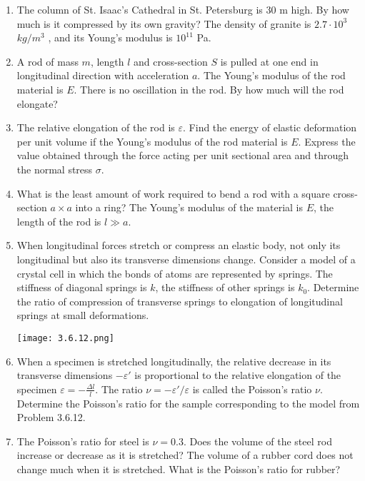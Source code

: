 \documentclass{article}
\begin{document}
\begin{enumerate}[label=3.6.\arabic*]
\item The column of St. Isaac's Cathedral in St. Petersburg is $30$ m high. By how much is it compressed by its own gravity? The density of granite is $2.7 \cdot 10^3$ $kg/m^3$ , and its Young's modulus is $10^{11}$ Pa.

\item A rod of mass $m$, length $l$ and cross-section $S$ is pulled at one end in longitudinal direction with acceleration $a$. The Young's modulus of the rod material is $E$. There is no oscillation in the rod. By how much will the rod elongate?

\item The relative elongation of the rod is $\varepsilon$. Find the energy of elastic deformation per unit volume if the Young's modulus of the rod material is $E$. Express the value obtained through the force acting per unit sectional area and through the normal stress $\sigma$.

\item What is the least amount of work required to bend a rod with a square cross-section $a \times a$ into a ring? The Young's modulus of the material is $E$, the length of the rod is $l \gg a$.

\item When longitudinal forces stretch or compress an elastic body, not only its longitudinal but also its transverse dimensions change. Consider a model of a crystal cell in which the bonds of atoms are represented by springs. The stiffness of diagonal springs is $k$, the stiffness of other springs is $k_0$. Determine the ratio of compression of transverse springs to elongation of longitudinal springs at small deformations.

\begin{center}
    \texttt{[image: 3.6.12.png]}
\end{center}

\item When a specimen is stretched longitudinally, the relative decrease in its transverse dimensions $-\varepsilon'$ is proportional to the relative elongation of the specimen $\varepsilon = -\frac{\Delta l}{l}$. The ratio $\nu = - \varepsilon'/\varepsilon$ is called the Poisson's ratio $\nu$. Determine the Poisson's ratio for the sample corresponding to the model from Problem 3.6.12.

\item The Poisson's ratio for steel is $\nu = 0.3$. Does the volume of the steel rod increase or decrease as it is stretched? The volume of a rubber cord does not change much when it is stretched. What is the Poisson's ratio for rubber?


\end{enumerate}
\end{document}

